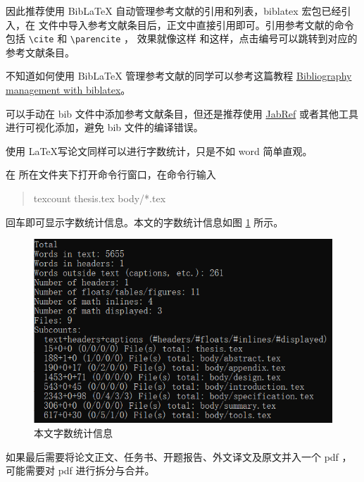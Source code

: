 因此推荐使用 BibLaTeX 自动管理参考文献的引用和列表，biblatex 宏包已经引入，在  文件中导入参考文献条目后，正文中直接引用即可。引用参考文献的命令包括 \verb!\cite! 和 \verb!\parencite! ， 效果就像这样 \cite{sample} 和这样\parencite{sample}，点击编号可以跳转到对应的参考文献条目。

不知道如何使用 BibLaTeX 管理参考文献的同学可以参考这篇教程 \href{https://www.overleaf.com/learn/latex/Bibliography_management_with_biblatex}{Bibliography management with biblatex}。

可以手动在 bib 文件中添加参考文献条目，但还是推荐使用 \href{https://www.jabref.org/}{JabRef} 或者其他工具进行可视化添加，避免 bib 文件的编译错误。


使用 \LaTeX 写论文同样可以进行字数统计，只是不如 word 简单直观。

在  所在文件夹下打开命令行窗口，在命令行输入 

\begin{quote}
texcount thesis.tex body/*.tex
\end{quote}

回车即可显示字数统计信息。本文的字数统计信息如图 \ref{fig:specification:texcount} 所示。

\begin{figure}[htbp]  %
  \centering  %
  \includegraphics[scale=.5]{figure/thesis/texcount.png}  %
  \caption{本文字数统计信息}  %
  \label{fig:specification:texcount}  %
\end{figure}

如果最后需要将论文正文、任务书、开题报告、外文译文及原文并入一个 pdf ，可能需要对 pdf 进行拆分与合并。

